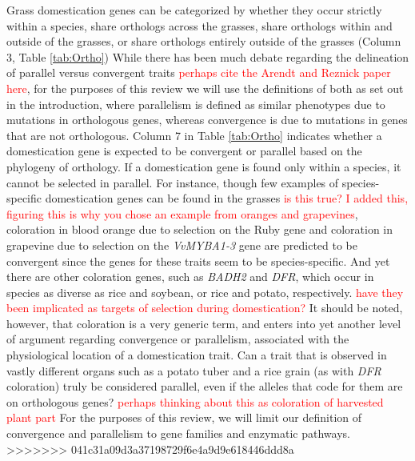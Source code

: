 \documentclass[12pt]{article}
\newcommand{\mbh}[1]{\textcolor{red}{\normalsize  #1}}
\begin{document}
Grass domestication genes can be categorized by whether they occur strictly within a species, share orthologs across the grasses, share orthologs within and outside of the grasses, or share orthologs entirely outside of the grasses (Column 3, Table \ref{tab:Ortho})
While there has been much debate regarding the delineation of parallel versus convergent traits \mbh{perhaps cite the Arendt and Reznick paper here}, for the purposes of this review we will use the definitions of both as set out in the introduction, where parallelism is defined as similar phenotypes due to mutations in orthologous genes, whereas convergence is due to mutations in genes that are not orthologous.
Column 7 in Table \ref{tab:Ortho} indicates whether a domestication gene is expected to be convergent or parallel based on the phylogeny of orthology.
If a domestication gene is found only within a species, it cannot be selected in parallel.
For instance, though few examples of species-specific domestication genes can be found in the grasses \mbh{is this true?  I added this, figuring this is why you chose an example from oranges and grapevines}, coloration in blood orange due to selection on the Ruby gene and coloration in grapevine due to selection on the \textit{VvMYBA1-3} gene are predicted to be convergent since the genes for these traits seem to be species-specific.
And yet there are other coloration genes, such as \textit{BADH2} and \textit{DFR}, which occur in species as diverse as rice and soybean, or rice and potato, respectively. \mbh{have they been implicated as targets of selection during domestication?}
It should be noted, however, that coloration is a very generic term, and enters into yet another level of argument regarding convergence or parallelism, associated with the physiological location of a domestication trait.
Can a trait that is observed in vastly different organs such as a potato tuber and a rice grain (as with \textit{DFR} coloration) truly be considered parallel, even if the alleles that code for them are on orthologous genes? \mbh{perhaps thinking about this as coloration of harvested plant part}
For the purposes of this review, we will limit our definition of convergence and parallelism to gene families and enzymatic pathways. 
>>>>>>> 041c31a09d3a37198729f6e4a9d9e618446ddd8a
\end{document}
